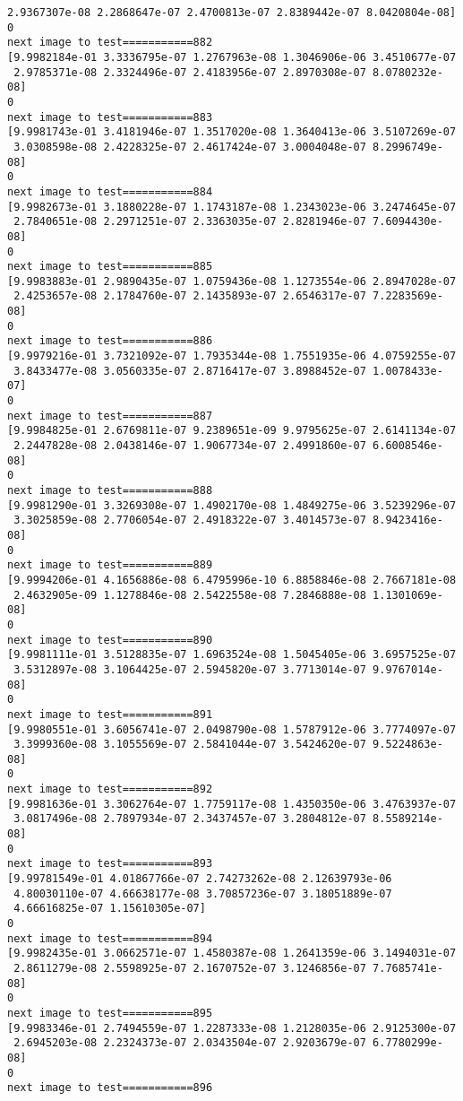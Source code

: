 \documentclass[11pt]{article}
\begin{document}
\begin{Verbatim}[commandchars=\\\{\}]
 2.9367307e-08 2.2868647e-07 2.4700813e-07 2.8389442e-07 8.0420804e-08]
0
next image to test===========882
[9.9982184e-01 3.3336795e-07 1.2767963e-08 1.3046906e-06 3.4510677e-07
 2.9785371e-08 2.3324496e-07 2.4183956e-07 2.8970308e-07 8.0780232e-08]
0
next image to test===========883
[9.9981743e-01 3.4181946e-07 1.3517020e-08 1.3640413e-06 3.5107269e-07
 3.0308598e-08 2.4228325e-07 2.4617424e-07 3.0004048e-07 8.2996749e-08]
0
next image to test===========884
[9.9982673e-01 3.1880228e-07 1.1743187e-08 1.2343023e-06 3.2474645e-07
 2.7840651e-08 2.2971251e-07 2.3363035e-07 2.8281946e-07 7.6094430e-08]
0
next image to test===========885
[9.9983883e-01 2.9890435e-07 1.0759436e-08 1.1273554e-06 2.8947028e-07
 2.4253657e-08 2.1784760e-07 2.1435893e-07 2.6546317e-07 7.2283569e-08]
0
next image to test===========886
[9.9979216e-01 3.7321092e-07 1.7935344e-08 1.7551935e-06 4.0759255e-07
 3.8433477e-08 3.0560335e-07 2.8716417e-07 3.8988452e-07 1.0078433e-07]
0
next image to test===========887
[9.9984825e-01 2.6769811e-07 9.2389651e-09 9.9795625e-07 2.6141134e-07
 2.2447828e-08 2.0438146e-07 1.9067734e-07 2.4991860e-07 6.6008546e-08]
0
next image to test===========888
[9.9981290e-01 3.3269308e-07 1.4902170e-08 1.4849275e-06 3.5239296e-07
 3.3025859e-08 2.7706054e-07 2.4918322e-07 3.4014573e-07 8.9423416e-08]
0
next image to test===========889
[9.9994206e-01 4.1656886e-08 6.4795996e-10 6.8858846e-08 2.7667181e-08
 2.4632905e-09 1.1278846e-08 2.5422558e-08 7.2846888e-08 1.1301069e-08]
0
next image to test===========890
[9.9981111e-01 3.5128835e-07 1.6963524e-08 1.5045405e-06 3.6957525e-07
 3.5312897e-08 3.1064425e-07 2.5945820e-07 3.7713014e-07 9.9767014e-08]
0
next image to test===========891
[9.9980551e-01 3.6056741e-07 2.0498790e-08 1.5787912e-06 3.7774097e-07
 3.3999360e-08 3.1055569e-07 2.5841044e-07 3.5424620e-07 9.5224863e-08]
0
next image to test===========892
[9.9981636e-01 3.3062764e-07 1.7759117e-08 1.4350350e-06 3.4763937e-07
 3.0817496e-08 2.7897934e-07 2.3437457e-07 3.2804812e-07 8.5589214e-08]
0
next image to test===========893
[9.99781549e-01 4.01867766e-07 2.74273262e-08 2.12639793e-06
 4.80030110e-07 4.66638177e-08 3.70857236e-07 3.18051889e-07
 4.66616825e-07 1.15610305e-07]
0
next image to test===========894
[9.9982435e-01 3.0662571e-07 1.4580387e-08 1.2641359e-06 3.1494031e-07
 2.8611279e-08 2.5598925e-07 2.1670752e-07 3.1246856e-07 7.7685741e-08]
0
next image to test===========895
[9.9983346e-01 2.7494559e-07 1.2287333e-08 1.2128035e-06 2.9125300e-07
 2.6945203e-08 2.2324373e-07 2.0343504e-07 2.9203679e-07 6.7780299e-08]
0
next image to test===========896

\end{Verbatim}
\end{document}
